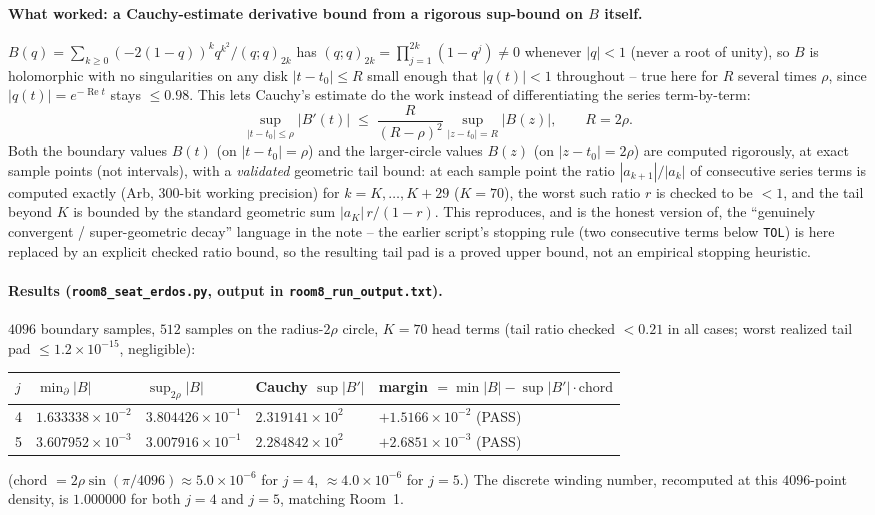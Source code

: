 \paragraph{What worked: a Cauchy-estimate derivative bound from a rigorous sup-bound on $B$ itself.}
$B(q)=\sum_{k\ge0}(-2(1-q))^kq^{k^2}/(q;q)_{2k}$ has $(q;q)_{2k}=\prod_{j=1}^{2k}(1-q^j)\ne0$
whenever $|q|<1$ (never a root of unity), so $B$ is holomorphic with no singularities on any disk
$|t-t_0|\le R$ small enough that $|q(t)|<1$ throughout -- true here for $R$ several times $\rho$, since
$|q(t)|=e^{-\operatorname{Re}t}$ stays $\le0.98$. This lets Cauchy's estimate do the work instead of
differentiating the series term-by-term:
\[
\sup_{|t-t_0|\le\rho}|B'(t)|\;\le\;\frac{R}{(R-\rho)^2}\sup_{|z-t_0|=R}|B(z)|,\qquad R=2\rho.
\]
Both the boundary values $B(t)$ (on $|t-t_0|=\rho$) and the larger-circle values $B(z)$ (on
$|z-t_0|=2\rho$) are computed rigorously, at exact sample points (not intervals), with a
\emph{validated} geometric tail bound: at each sample point the ratio $|a_{k+1}|/|a_k|$ of consecutive
series terms is computed exactly (Arb, 300-bit working precision) for $k=K,\dots,K+29$ ($K=70$), the
worst such ratio $r$ is checked to be $<1$, and the tail beyond $K$ is bounded by the standard geometric
sum $|a_K|\,r/(1-r)$. This reproduces, and is the honest version of, the ``genuinely convergent /
super-geometric decay'' language in the note -- the earlier script's stopping rule (two consecutive
terms below \texttt{TOL}) is here replaced by an explicit checked ratio bound, so the resulting tail pad
is a proved upper bound, not an empirical stopping heuristic.

\paragraph{Results (\texttt{room8\_seat\_erdos.py}, output in \texttt{room8\_run\_output.txt}).}
$4096$ boundary samples, $512$ samples on the radius-$2\rho$ circle, $K=70$ head terms (tail ratio
checked $<0.21$ in all cases; worst realized tail pad $\le1.2\times10^{-15}$, negligible):

\begin{center}
\begin{tabular}{l l l l l}
\toprule
$j$ & $\min_{\partial}|B|$ & $\sup_{2\rho}|B|$ & Cauchy $\sup|B'|$ & margin $=\min|B|-\sup|B'|\cdot\text{chord}$\\
\midrule
4 & $1.633338\times10^{-2}$ & $3.804426\times10^{-1}$ & $2.319141\times10^{2}$ & $+1.5166\times10^{-2}$ (PASS)\\
5 & $3.607952\times10^{-3}$ & $3.007916\times10^{-1}$ & $2.284842\times10^{2}$ & $+2.6851\times10^{-3}$ (PASS)\\
\bottomrule
\end{tabular}
\end{center}
(chord $=2\rho\sin(\pi/4096)\approx5.0\times10^{-6}$ for $j=4$, $\approx4.0\times10^{-6}$ for $j=5$.)
The discrete winding number, recomputed at this $4096$-point density, is $1.000000$ for both $j=4$ and
$j=5$, matching Room~1.

